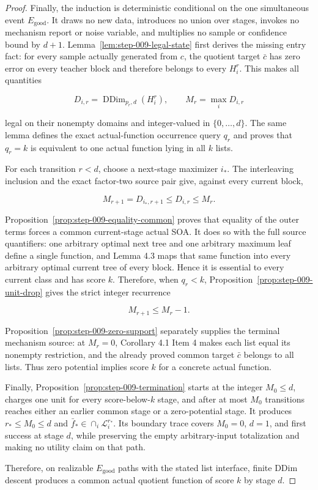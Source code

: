 \begin{proof}
Finally, the induction is deterministic conditional on the one
simultaneous event \(E_{\mathrm{good}}\). It draws no new data, introduces
no union over stages, invokes no mechanism report or noise variable, and
multiplies no sample or confidence bound by \(d+1\). 
Lemma~\ref{lem:step-009-legal-state} first derives the missing entry fact:
for every sample actually generated from \(c\), the quotient target
\(\bar c\) has zero error on every teacher block and therefore belongs to
every \(H_i^r\). This makes all quantities

\[
 D_{i,r}=\operatorname{DDim}_{p_r,d}(H_i^r),
 \qquad M_r=\max_iD_{i,r}
\]

legal on their nonempty domains and integer-valued in
\(\{0,\ldots,d\}\). The same lemma defines the exact actual-function
occurrence query \(q_r\) and proves that \(q_r=k\) is equivalent to one
actual function lying in all \(k\) lists.

For each transition \(r<d\), choose a next-stage maximizer \(i_*\).
The  interleaving inclusion and the exact factor-two source pair
give, against every current block,

\[
 M_{r+1}=D_{i_*,r+1}\le D_{i,r}\le M_r.
\]

Proposition~\ref{prop:step-009-equality-common} proves that equality of the
outer terms forces a common current-stage actual SOA. It does so with the
full source quantifiers: one arbitrary optimal next tree and one arbitrary
maximum leaf define a single function, and Lemma 4.3 maps that same
function into every arbitrary optimal current tree of every block. Hence
it is essential to every current class and has score \(k\). Therefore,
when \(q_r<k\), Proposition~\ref{prop:step-009-unit-drop} gives the strict
integer recurrence

\[
 M_{r+1}\le M_r-1.
\]

Proposition~\ref{prop:step-009-zero-support} separately supplies the
terminal mechanism source: at \(M_r=0\), Corollary 4.1 Item 4 makes each
list equal its nonempty restriction, and the already proved common target
\(\bar c\) belongs to all lists. Thus zero potential implies score \(k\)
for a concrete actual function.

Finally, Proposition~\ref{prop:step-009-termination} starts at the integer
\(M_0\le d\), charges one unit for every score-below-\(k\) stage, and after
at most \(M_0\) transitions reaches either an earlier common stage or a
zero-potential stage. It produces \(r_*\le M_0\le d\) and
\(\bar f_*\in\cap_i\mathcal L_i^{r_*}\). Its boundary trace covers
\(M_0=0\), \(d=1\), and first success at stage \(d\), while preserving the
empty arbitrary-input totalization and making no utility claim on
that path.

Therefore, on realizable \(E_{\mathrm{good}}\) paths with the stated list
interface, finite DDim descent produces a common actual quotient function
of score \(k\) by stage \(d\).



\end{proof}

